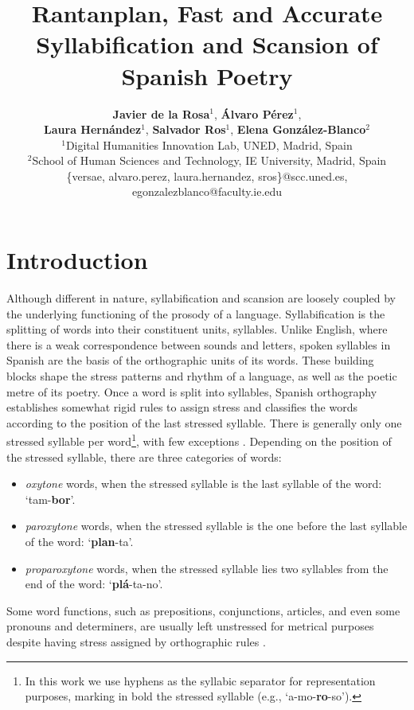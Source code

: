 \documentclass[a4paper,11pt,twocolumn,twoside]{article}
\title{Rantanplan, Fast and Accurate Syllabification and Scansion of Spanish Poetry}
\author {\textbf{Javier de la Rosa$^1$}, \textbf{Álvaro Pérez$^1$}, \\
\textbf{Laura Hernández$^1$}, \textbf{Salvador Ros$^1$}, \textbf{Elena González-Blanco$^2$}\\
$^1$Digital Humanities Innovation Lab, UNED, Madrid, Spain\\
$^2$School of Human Sciences and Technology, IE University, Madrid, Spain\\ \{versae, alvaro.perez, laura.hernandez, sros\}@scc.uned.es,\\
egonzalezblanco@faculty.ie.edu}
\begin{document}

\setlength\titlebox{19cm} %


\label{firstpage} \maketitle

%

\section{Introduction}
Although different in nature, syllabification and scansion are loosely coupled by the underlying functioning of the prosody of a language. Syllabification is the splitting of words into their constituent units, syllables. Unlike English, where there is a weak correspondence between sounds and letters, spoken syllables in Spanish are the basis of the orthographic units of its words. These building blocks shape the stress patterns and rhythm of a language, as well as the poetic metre of its poetry. Once a word is split into syllables, Spanish orthography establishes somewhat rigid rules to assign stress and classifies the words according to the position of the last stressed syllable. There is generally only one stressed syllable per word\footnote{In this work we use hyphens as the syllabic separator for representation purposes, marking in bold the stressed syllable (e.g., `a-mo-\textbf{ro}-so').}, with few exceptions \cite{espanola2010ortografia}. Depending on the position of the stressed syllable, there are three categories of words:
\begin{itemize}
\item \textit{oxytone} words, when the stressed syllable is the last syllable of the word: `tam-\textbf{bor}'.
\item \textit{paroxytone} words, when the stressed syllable is the one before the last syllable of the word: `\textbf{plan}-ta'.
\item \textit{proparoxytone} words, when the stressed syllable lies two syllables from the end of the word: `\textbf{plá}-ta-no'.
\end{itemize}
Some word functions, such as prepositions, conjunctions, articles, and even some pronouns and determiners, are usually left unstressed for metrical purposes despite having stress assigned by orthographic rules \cite{caparros1993metrica}.
\end{document}
